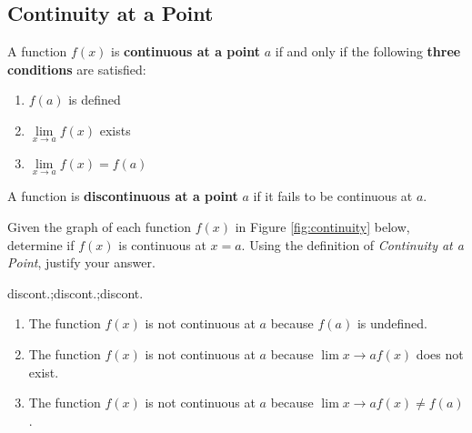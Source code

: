 \subsection*{Continuity at a Point}%
\begin{tcolorbox}[title = {Definition)}]
A function $f(x)$ is \textbf{continuous at a point} $a$ if and only if the following \textbf{three conditions} are satisfied:
\renewcommand{\labelenumi}{\roman{enumi}}
\begin{enumerate}[leftmargin=*]
\item $f(a)$ is defined
\item $\lim\limits_{x \to a} f(x)$ exists
\item $\lim\limits_{x \to a} f(x)=f(a)$ 
\end{enumerate}
A function is \textbf{discontinuous at a point} $a$ if it fails to be continuous at $a$.
\end{tcolorbox}
\begin{example}
Given the graph of each function $f(x)$ in Figure \ref{fig:continuity} below, determine if $f(x)$ is continuous at $x=a$. Using the definition of \emph{Continuity at a Point}, justify your answer.
    \begin{sol}
    discont.;discont.;discont.
    \end{sol}
    \begin{solL}
    \renewcommand{\labelenumi}{\alph{enumi}}
    \begin{enumerate}
        \item The function $f(x)$ is not continuous at $a$ because $f(a)$ is undefined.
        \item The function $f(x)$ is not continuous at $a$ because $\lim\limits {x \to a} f(x)$ does not exist.
        \item The function $f(x)$ is not continuous at $a$ because $\lim\limits {x \to a} f(x)\ne f(a)$.
    \end{enumerate}
    
    \end{solL}
    
\end{example}
